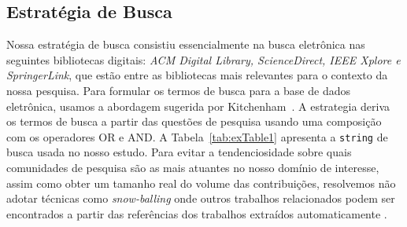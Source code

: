 \subsection{Estratégia de Busca}\label{estrategia_busca}
	Nossa estratégia de busca consistiu essencialmente na busca eletrônica nas seguintes bibliotecas digitais: 
\emph{ACM Digital Library, ScienceDirect, IEEE Xplore e SpringerLink}, que estão entre as bibliotecas mais relevantes para o contexto da nossa pesquisa. Para formular os termos de busca para a base de dados eletrônica, usamos a abordagem sugerida por Kitchenham~\cite{kitchenham:techReport2007,budgen:ppig2008}. A estrategia deriva os termos de busca a partir das questões de pesquisa usando uma composição com os operadores OR e AND. A  Tabela~\ref{tab:exTable1} apresenta a \texttt{string} de busca usada no nosso estudo. Para evitar a tendenciosidade sobre quais comunidades de pesquisa s\~{a}o as mais atuantes no nosso dom\'{i}nio de interesse, assim como obter um tamanho real do volume das contribuições, resolvemos não adotar técnicas como \emph{snow-balling} onde outros trabalhos relacionados podem ser encontrados a partir das referências dos trabalhos extraídos automaticamente \cite{budgen:ppig2008}.


